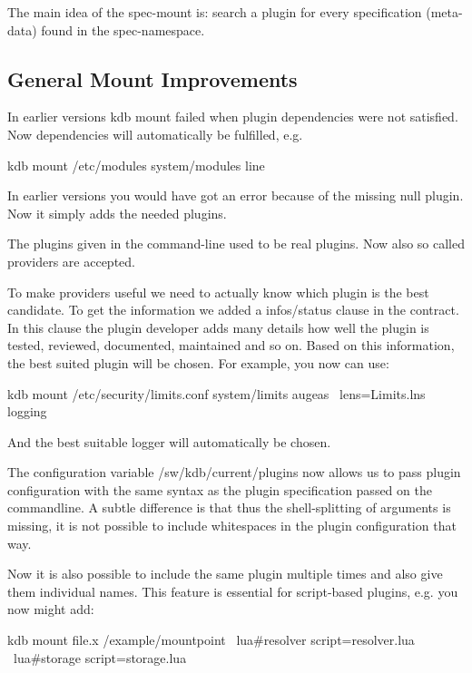 The main idea of the spec-\/mount is\+: search a plugin for every specification (meta-\/data) found in the spec-\/namespace.

\subsection*{General Mount Improvements}

In earlier versions {\ttfamily kdb mount} failed when plugin dependencies were not satisfied. Now dependencies will automatically be fulfilled, e.\+g. \begin{DoxyVerb}    kdb mount /etc/modules system/modules line
\end{DoxyVerb}


In earlier versions you would have got an error because of the missing {\ttfamily null} plugin. Now it simply adds the needed plugins.

The plugins given in the command-\/line used to be real plugins. Now also so called providers are accepted.

To make providers useful we need to actually know which plugin is the best candidate. To get the information we added a {\ttfamily infos/status} clause in the contract. In this clause the plugin developer adds many details how well the plugin is tested, reviewed, documented, maintained and so on. Based on this information, the best suited plugin will be chosen. For example, you now can use\+: \begin{DoxyVerb}    kdb mount /etc/security/limits.conf system/limits augeas \
            lens=Limits.lns logging
\end{DoxyVerb}


And the best suitable logger will automatically be chosen.

The configuration variable {\ttfamily /sw/kdb/current/plugins} now allows us to pass plugin configuration with the same syntax as the plugin specification passed on the commandline. A subtle difference is that thus the shell-\/splitting of arguments is missing, it is not possible to include whitespaces in the plugin configuration that way.

Now it is also possible to include the same plugin multiple times and also give them individual names. This feature is essential for script-\/based plugins, e.\+g. you now might add\+: \begin{DoxyVerb}    kdb mount file.x /example/mountpoint \
            lua#resolver script=resolver.lua \
            lua#storage script=storage.lua
\end{DoxyVerb}


